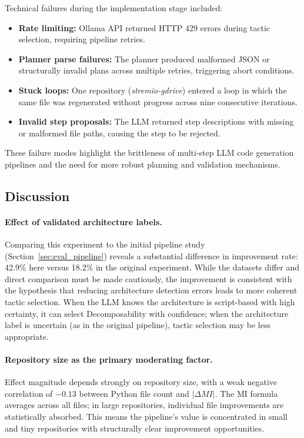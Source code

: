 \documentclass[sigconf,review,anonymous]{acmart}
\begin{document}
Technical failures during the implementation stage included:

\begin{itemize}[nosep]
    \item \textbf{Rate limiting:} Ollama API returned HTTP 429 errors during tactic selection, requiring pipeline retries.
    \item \textbf{Planner parse failures:} The planner produced malformed JSON or structurally invalid plans across multiple retries, triggering abort conditions.
    \item \textbf{Stuck loops:} One repository (\textit{stremio-gdrive}) entered a loop in which the same file was regenerated without progress across nine consecutive iterations.
    \item \textbf{Invalid step proposals:} The LLM returned step descriptions with missing or malformed file paths, causing the step to be rejected.
\end{itemize}

These failure modes highlight the brittleness of multi-step LLM code generation pipelines and the need for more robust planning and validation mechanisms.

\subsection{Discussion}

\paragraph{Effect of validated architecture labels.} Comparing this experiment to the initial pipeline study (Section~\ref{sec:eval_pipeline}) reveals a substantial difference in improvement rate: 42.9\% here versus 18.2\% in the original experiment. While the datasets differ and direct comparison must be made cautiously, the improvement is consistent with the hypothesis that reducing architecture detection errors leads to more coherent tactic selection. When the LLM knows the architecture is script-based with high certainty, it can select Decomposability with confidence; when the architecture label is uncertain (as in the original pipeline), tactic selection may be less appropriate.

\paragraph{Repository size as the primary moderating factor.} Effect magnitude depends strongly on repository size, with a weak negative correlation of $-0.13$ between Python file count and $|\Delta MI|$. The MI formula averages across all files; in large repositories, individual file improvements are statistically absorbed. This means the pipeline's value is concentrated in small and tiny repositories with structurally clear improvement opportunities.
\end{document}
